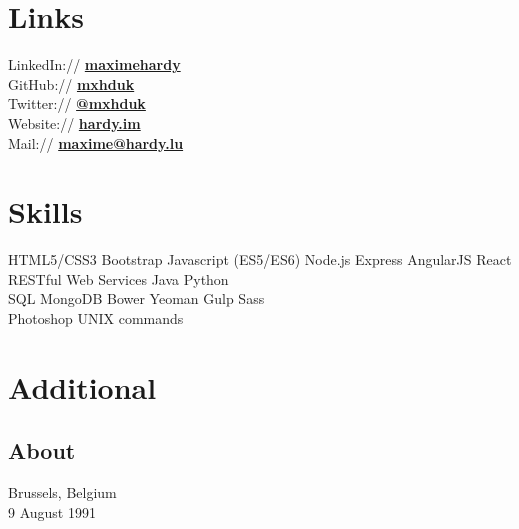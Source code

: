 \documentclass[letterpaper]{my-resume}
\begin{document}
\begin{minipage}[t]{0.33\textwidth}

\sectionspace


\section{Links} 

LinkedIn:// \href{https://www.linkedin.com/in/maximehardy}{\bf maximehardy} \\
GitHub:// \href{https://github.com/mxhuk}{\bf mxhduk} \\
Twitter:// \href{https://twitter.com/mxhduk}{\bf @mxhduk} \\
Website:// \href{http://hardy.im}{\bf hardy.im} \\
Mail:// \href{mailto:maxime@hardy.lu}{\bf maxime@hardy.lu}

\sectionspace


\section{Skills}

HTML5/CSS3 \textbullet{} Bootstrap \textbullet{} Javascript (ES5/ES6) \textbullet{} Node.js \textbullet{} Express \textbullet{} AngularJS \textbullet{} React \textbullet{} RESTful Web Services \textbullet{} Java \textbullet{} Python \\
SQL \textbullet{} MongoDB \textbullet{} Bower \textbullet{} Yeoman \textbullet{} Gulp \textbullet{} Sass \\
Photoshop \textbullet{} UNIX commands

\sectionspace


\section{Additional}

\subsection{About}

Brussels, Belgium \\
9 August 1991 

\sectionspace


\end{minipage}
\hfill
\end{document}
